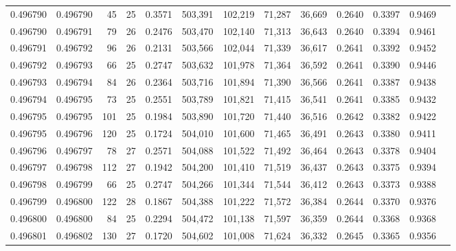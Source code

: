 \begin{tabular}{rrrrrrrrrrrrr}
0.496790 & 0.496790 &  45 &  25 &                                     0.3571 & 503,391 & 102,219 &  71,287 &  36,669 & 0.2640 & 0.3397 & 0.9469 \\
0.496790 & 0.496791 &  79 &  26 &                                     0.2476 & 503,470 & 102,140 &  71,313 &  36,643 & 0.2640 & 0.3394 & 0.9461 \\
0.496791 & 0.496792 &  96 &  26 &                                     0.2131 & 503,566 & 102,044 &  71,339 &  36,617 & 0.2641 & 0.3392 & 0.9452 \\
0.496792 & 0.496793 &  66 &  25 &                                     0.2747 & 503,632 & 101,978 &  71,364 &  36,592 & 0.2641 & 0.3390 & 0.9446 \\
0.496793 & 0.496794 &  84 &  26 &                                     0.2364 & 503,716 & 101,894 &  71,390 &  36,566 & 0.2641 & 0.3387 & 0.9438 \\
0.496794 & 0.496795 &  73 &  25 &                                     0.2551 & 503,789 & 101,821 &  71,415 &  36,541 & 0.2641 & 0.3385 & 0.9432 \\
0.496795 & 0.496795 & 101 &  25 &                                     0.1984 & 503,890 & 101,720 &  71,440 &  36,516 & 0.2642 & 0.3382 & 0.9422 \\
0.496795 & 0.496796 & 120 &  25 &                                     0.1724 & 504,010 & 101,600 &  71,465 &  36,491 & 0.2643 & 0.3380 & 0.9411 \\
0.496796 & 0.496797 &  78 &  27 &                                     0.2571 & 504,088 & 101,522 &  71,492 &  36,464 & 0.2643 & 0.3378 & 0.9404 \\
0.496797 & 0.496798 & 112 &  27 &                                     0.1942 & 504,200 & 101,410 &  71,519 &  36,437 & 0.2643 & 0.3375 & 0.9394 \\
0.496798 & 0.496799 &  66 &  25 &                                     0.2747 & 504,266 & 101,344 &  71,544 &  36,412 & 0.2643 & 0.3373 & 0.9388 \\
0.496799 & 0.496800 & 122 &  28 &                                     0.1867 & 504,388 & 101,222 &  71,572 &  36,384 & 0.2644 & 0.3370 & 0.9376 \\
0.496800 & 0.496800 &  84 &  25 &                                     0.2294 & 504,472 & 101,138 &  71,597 &  36,359 & 0.2644 & 0.3368 & 0.9368 \\
0.496801 & 0.496802 & 130 &  27 &                                     0.1720 & 504,602 & 101,008 &  71,624 &  36,332 & 0.2645 & 0.3365 & 0.9356 \\

\end{tabular}

